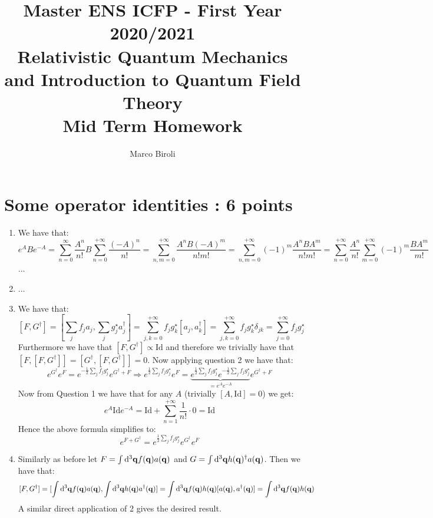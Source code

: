 \documentclass[10pt,a4paper]{article}
\author{Marco Biroli}
\title{Master ENS ICFP - First Year 2020/2021\\
Relativistic Quantum Mechanics and Introduction to Quantum Field Theory\\
Mid Term Homework}
\begin{document}
\maketitle

\section[Exercise]{Some operator identities : 6 points}

\begin{enumerate}
\item We have that:
\[
e^A B e^{-A} = \sum_{n = 0}^{\infty} \frac{A^n}{n!} B \sum_{n = 0}^{+\infty} \frac{(-A)^n}{n!} = \sum_{n, m = 0}^{+\infty} \frac{A^n B (-A)^m}{n!m!} = \sum_{n, m = 0}^{+\infty} (-1)^m \frac{A^n B A^m}{n! m!} = \sum_{n = 0}^{+\infty} \frac{A^n}{n!} \sum_{m = 0}^{+\infty} (-1)^m \frac{BA^m}{m!}
\]
...

\item ...

\item We have that:
\[
[F, G^\dagger] = [\sum_j f_j a_j, \sum_j g_j^\star a_j^\dagger] = \sum_{j, k = 0}^{+\infty} f_j g_k^\star [a_j, a_k^\dagger] = \sum_{j, k = 0}^{+\infty} f_j g_k^\star \delta_{jk} = \sum_{j = 0}^{+\infty} f_j g_j^\star
\]
Furthermore we have that $[F, G^\dagger] \propto \text{Id}$ and therefore we trivially have that $[F, [F, G^\dagger]] = [G^\dagger, [F, G^\dagger]] = 0$. Now applying question 2 we have that:
\[
e^{G^\dagger} e^F = e^{-\frac{1}{2} \sum_{j} f_j g_j^\star } e^{G^\dagger + F} \Rightarrow  e^{\frac{1}{2} \sum_{j} f_j g_j^\star }e^F =  \underbrace{e^{\frac{1}{2} \sum_{j} f_j g_j^\star } e^{-\frac{1}{2} \sum_{j} f_j g_j^\star }}_{=e^A e^{-A}} e^{G^\dagger + F}
\]
Now from Question 1 we have that for any $A$ (trivially $[A, \text{Id}] = 0$) we get:
\[
e^A \text{Id} e^{-A} = \text{Id} + \sum_{n=1}^{+\infty} \frac{1}{n!} \cdot 0 = \text{Id}
\]
Hence the above formula simplifies to:
\[
e^{F + G^\dagger} = e^{\frac{1}{2}\sum_j f_jg_j^\star} e^{G^\dagger} e^F
\]

\item Similarly as before let $F = \int \dd^3 \vb{q} f(\vb{q}) a(\vb{q})$ and $G = \int \dd^3 \vb{q} h(\vb{q})^\dagger a(\vb{q})$. Then we have that:
\[
[F, G^\dagger] = [ \int \dd^3 \vb{q} f(\vb{q}) a(\vb{q}), \int \dd^3 \vb{q} h(\vb{q}) a^\dagger(\vb{q})] = \int \dd^3 \vb{q} f(\vb{q})h(\vb{q})[a(\vb{q}), a^\dagger(\vb{q})] = \int \dd^3 \vb{q} f(\vb{q}) h(\vb{q})
\]
A similar direct application of 2 gives the desired result.

\end{enumerate}
\end{document}
